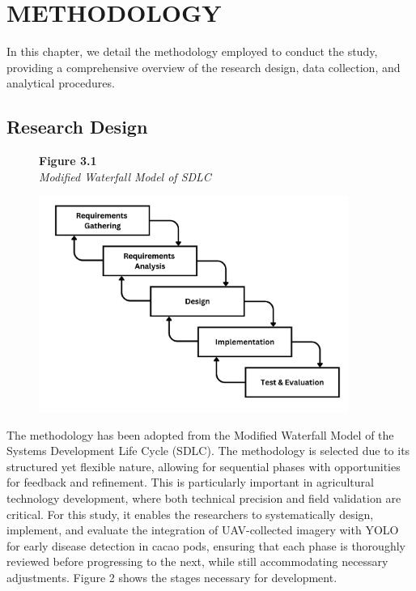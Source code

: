 \chapter{METHODOLOGY}


	In this chapter, we detail the methodology employed to conduct the study, providing a comprehensive overview of the research design, data collection, and analytical procedures.
	
	\section{Research Design}
	
	\begin{figure}[H]
		\raggedright
		\textbf{Figure 3.1} \\ %
		\textit{Modified Waterfall Model of SDLC} %
		
		\vspace{0.5em}
		\centering
		\includegraphics[width=0.9\textwidth]{figures/Waterfall.pdf} %
		
		\vspace{0.5em}
		\raggedright
		
		\label{fig:waterfall}
	\end{figure}
	
	The methodology has been adopted from the Modified Waterfall Model of the Systems Development Life Cycle (SDLC). The methodology is selected due to its structured yet flexible nature, allowing for sequential phases with opportunities for feedback and refinement. This is particularly important in agricultural technology development, where both technical precision and field validation are critical. For this study, it enables the researchers to systematically design, implement, and evaluate the integration of UAV-collected imagery with YOLO for early disease detection in cacao pods, ensuring that each phase is thoroughly reviewed before progressing to the next, while still accommodating necessary adjustments. Figure 2 shows the stages necessary for development.
	
